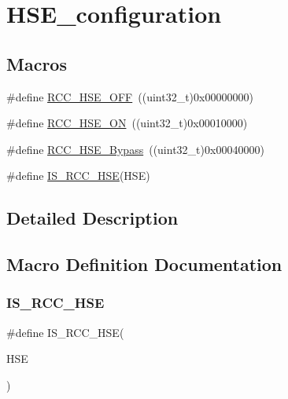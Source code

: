 \hypertarget{group___h_s_e__configuration}{}\section{H\+S\+E\+\_\+configuration}
\label{group___h_s_e__configuration}
\subsection*{Macros}
\begin{DoxyCompactItemize}
\item 
\#define \mbox{\hyperlink{group___h_s_e__configuration_ga1616626d23fbce440398578855df6f97}{R\+C\+C\+\_\+\+H\+S\+E\+\_\+\+O\+FF}}~((uint32\+\_\+t)0x00000000)
\item 
\#define \mbox{\hyperlink{group___h_s_e__configuration_gabc4f70a44776c557af20496b04d9a9db}{R\+C\+C\+\_\+\+H\+S\+E\+\_\+\+ON}}~((uint32\+\_\+t)0x00010000)
\item 
\#define \mbox{\hyperlink{group___h_s_e__configuration_ga09061e9909d5f588baa7bfb0f7edd9fa}{R\+C\+C\+\_\+\+H\+S\+E\+\_\+\+Bypass}}~((uint32\+\_\+t)0x00040000)
\item 
\#define \mbox{\hyperlink{group___h_s_e__configuration_ga287bbcafd73d07ec915c2f793301908a}{I\+S\+\_\+\+R\+C\+C\+\_\+\+H\+SE}}(H\+SE)
\end{DoxyCompactItemize}


\subsection{Detailed Description}


\subsection{Macro Definition Documentation}
\mbox{\label{group___h_s_e__configuration_ga287bbcafd73d07ec915c2f793301908a}} 
\subsubsection{\texorpdfstring{IS\_RCC\_HSE}{IS\_RCC\_HSE}}
{\footnotesize\ttfamily \#define I\+S\+\_\+\+R\+C\+C\+\_\+\+H\+SE(\begin{DoxyParamCaption}\item[{}]{H\+SE }\end{DoxyParamCaption})}

